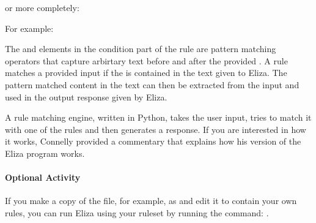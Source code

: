 \documentclass[letterpaper,10pt,english]{sphinxmanual}
\begin{document}
{or more completely:

\begin{sphinxVerbatim}[commandchars=\\\{\}]
 \PYG{p}{[}
        \PYG{p}{]}
\end{sphinxVerbatim}

For example:

\begin{sphinxVerbatim}[commandchars=\\\{\}]
 \PYG{p}{[}
    \PYG{p}{]}
\end{sphinxVerbatim}

The  and  elements in the condition part of the rule are pattern matching operators that capture arbirtary text before and after the provided . A rule matches a provided input if the  is contained in the text given to Eliza. The pattern matched content in the text can then be extracted from the input and used in the output response given by Eliza.

A rule matching engine, written in Python, takes the user input, tries to match it with one of the rules and then generates a response. If you are interested in how it works, Connelly provided a commentary  that explains how his version of the Eliza program works.


\paragraph{Optional Activity}
\label{\detokenize{content/03_Robot_Lab/Section_00_04:Optional-Activity}}
If you make a copy of the  file, for example, as  and edit it to contain your own rules, you can run Eliza using your ruleset by running the command: .

}
\end{document}
